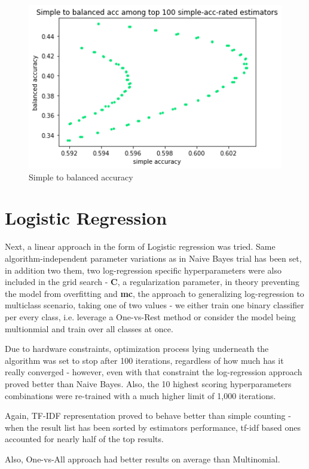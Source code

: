 \documentclass[letterpaper]{article}
\begin{document}
\begin{figure}[h]
    \centering
    \includegraphics[scale=0.5]{naive-bayes-simple-to-balanced.png}
    \caption{Simple to balanced accuracy}
\end{figure}

\section{Logistic Regression}
Next, a linear approach in the form of Logistic regression was tried.
Same algorithm-independent parameter variations as in Naive Bayes trial has been set, in addition two
them, two log-regression specific hyperparameters were also included in the grid search -\textbf{ C}, a regularization
parameter, in theory preventing the model from overfitting and \textbf{mc}, the approach to generalizing log-regression
to multiclass scenario, taking one of two values - we either train one binary classifier per every class, i.e.
leverage a One-vs-Rest method or consider the model being multionmial and train over all classes at once.

Due to hardware constraints, optimization process lying underneath the algorithm was set to stop after 100 iterations,
regardless of how much has it really converged - however, even with that constraint the log-regression approach
proved better than Naive Bayes. Also, the 10 highest scoring hyperparameters combinations
were re-trained with a much higher limit of 1,000 iterations.

Again, TF-IDF representation proved to behave better than simple counting - when the result list has been
sorted by estimators performance, tf-idf based ones accounted for nearly half of the top results.

Also, One-vs-All approach had better results on average than Multinomial.
\end{document}
